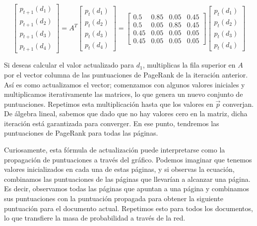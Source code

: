 \begin{equation}
\begin{bmatrix}
p_{t+1}(d_1) \\
p_{t+1}(d_2) \\
p_{t+1}(d_3) \\
p_{t+1}(d_4)
\end{bmatrix}
= A^T
\begin{bmatrix}
p_t (d_1) \\
p_t (d_2) \\
p_t (d_3) \\
p_t (d_4)
\end{bmatrix}
= 
\begin{bmatrix}
0.5 & 0.85 & 0.05 & 0.45 \\
0.5 & 0.05 & 0.85 & 0.45 \\
0.45 & 0.05 & 0.05 & 0.05 \\
0.45 & 0.05 & 0.05 & 0.05
\end{bmatrix}
\begin{bmatrix}
p_t (d_1) \\
p_t (d_2) \\
p_t (d_3) \\
p_t (d_4)
\end{bmatrix}
\end{equation}

Si deseas calcular el valor actualizado para \(d_1\), multiplicas la fila superior en \(A\) por el vector columna de las puntuaciones de PageRank de la iteración anterior. Así es como actualizamos el vector; comenzamos con algunos valores iniciales y multiplicamos iterativamente las matrices, lo que genera un nuevo conjunto de puntuaciones. Repetimos esta multiplicación hasta que los valores en \(\vec{p}\) converjan. De álgebra lineal, sabemos que dado que no hay valores cero en la matriz, dicha iteración está garantizada para converger. En ese punto, tendremos las puntuaciones de PageRank para todas las páginas.

Curiosamente, esta fórmula de actualización puede interpretarse como la propagación de puntuaciones a través del gráfico. Podemos imaginar que tenemos valores inicializados en cada una de estas páginas, y si observas la ecuación, combinamos las puntuaciones de las páginas que llevarían a alcanzar una página. Es decir, observamos todas las páginas que apuntan a una página y combinamos sus puntuaciones con la puntuación propagada para obtener la siguiente puntuación para el documento actual. Repetimos esto para todos los documentos, lo que transfiere la masa de probabilidad a través de la red.

